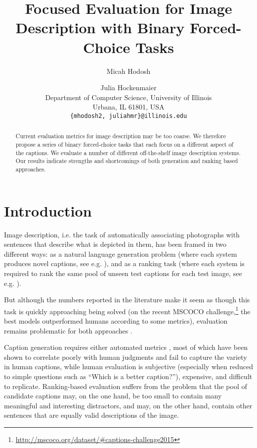 \documentclass[11pt]{article}
\title{Focused Evaluation for Image Description with Binary Forced-Choice Tasks}
\author{Micah Hodosh \and Julia Hockenmaier\\	   
          Department of Computer Science, University of Illinois\\
          Urbana, IL 61801, USA\\
  {\tt \{mhodosh2, juliahmr\}@illinois.edu}}
\date{}
\begin{document}
\maketitle

\begin{abstract}
 Current evaluation metrics for image description may be
 too coarse. We therefore propose a series of binary forced-choice tasks that each focus on a different
 aspect of the captions. We evaluate a number of different off-the-shelf image description systems.
Our results indicate  strengths and shortcomings of both generation and ranking based approaches. 
\end{abstract}

\section{Introduction}
\label{sec:introduction}
Image description, i.e. the task of automatically associating photographs with sentences that describe what is depicted in them, has been framed in two different ways: as a natural language generation problem (where each system produces novel captions, see e.g. ), and as a ranking task (where each system is required to rank the same pool of unseen test captions for each test image, see e.g. ).  

But although the numbers reported in the literature make it seem as though this task is quickly approaching being solved  (on the recent MSCOCO challenge,\footnote{\tiny\url{http://mscoco.org/dataset/#captions-challenge2015}} the best models outperformed humans according to some metrics), evaluation remains problematic for both approaches \cite{Hodosh15}. 

Caption generation requires either automated metrics  \cite{papineni-EtAl:2002:ACL,lin:2004:ACLsummarization,denkowski:lavie:meteor-wmt:2014,DBLP:conf/cvpr/VedantamZP15}, most of which have been shown to correlate poorly with human judgments \cite{hodoshJAIR,elliott-keller:2014:P14-2,Hodosh15} and fail to capture the variety in human captions, while human evaluation is subjective (especially when reduced to simple questions such as ``Which is a better caption?''), expensive, and difficult to replicate. Ranking-based evaluation suffers from the problem that the pool of candidate captions may,  on the one hand, be too small to contain many meaningful and interesting distractors, and may, on the other hand, contain other sentences that are equally valid descriptions of the image.  
\end{document}
